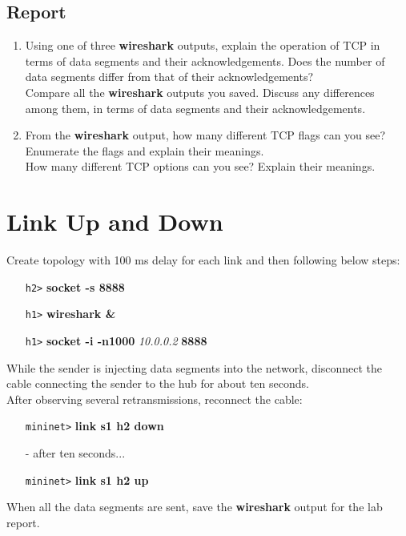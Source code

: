 \documentclass[10pt,a4paper]{article}
\numberwithin{equation}{section}
\numberwithin{figure}{section}
\numberwithin{table}{section}
\begin{document}
    \subsection*{Report}
    \begin{enumerate}
        \item Using one of three \textbf{wireshark} outputs, explain the operation of TCP in terms of data segments and their acknowledgements. Does the number of data segments differ from that of their acknowledgements? \\
        Compare all the \textbf{wireshark} outputs you saved.
        Discuss any differences among them, in terms of data segments and their acknowledgements.
        \item From the \textbf{wireshark} output, how many different TCP flags can you see? Enumerate the flags and explain their meanings. \\
        How many different TCP options can you see?
        Explain their meanings.
    \end{enumerate}
    

\section*{Link Up and Down}
    Create topology with 100 ms delay for each link and then following below steps:
    \begin{itemize}
    	\item [\texttt{h2>}] \textbf{socket -s 8888}
    	\item [\texttt{h1>}] \textbf{wireshark \&}
        \item [\texttt{h1>}] \textbf{socket -i -n1000} \textit{10.0.0.2} \textbf{8888}
    \end{itemize}
    While the sender is injecting data segments into the network, disconnect the cable connecting the sender to the hub for about ten seconds. \\
    After observing several retransmissions, reconnect the cable:
    \begin{itemize}
    	\setlength{\itemindent}{30pt}
        \item [\texttt{mininet>}] \textbf{link s1 h2 down}
        \item [-] after ten seconds...
        \item [\texttt{mininet>}] \textbf{link s1 h2 up}
    \end{itemize}
    When all the data segments are sent, save the \textbf{wireshark} output for the lab report.
\end{document}
